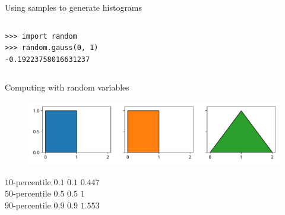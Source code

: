 \documentclass[12pt, aspectratio=149]{beamer}
\theoremstyle{plain}
\begin{document}
\begin{frame}[fragile]{Using samples to generate histograms}
\begin{columns}
\begin{column}{0.5\textwidth}
\begin{center}
\begin{figure}
     \end{figure}
      \begin{verbatim}
>>> import random
>>> random.gauss(0, 1)
-0.19223758016631237
      \end{verbatim}
     \end{center}
\end{column}
\end{columns}
\end{frame}

\begin{frame}[fragile]{Computing with random variables}
    \begin{center}
     \begin{figure}
     	\centering
     	\includegraphics[width=0.99\linewidth]{figures/add_uniform}
     \end{figure}
     \end{center}
     $10$-percentile \hspace*{1em} $0.1$ \hspace*{5em}  $0.1$ \hspace*{7em} $0.447$ \\
     $50$-percentile \hspace*{1em} $0.5$ \hspace*{5em}  $0.5$ \hspace*{7em} $1$ \\
     $90$-percentile \hspace*{1em} $0.9$ \hspace*{5em}  $0.9$ \hspace*{7em} $1.553$
\end{frame}
\end{document}
